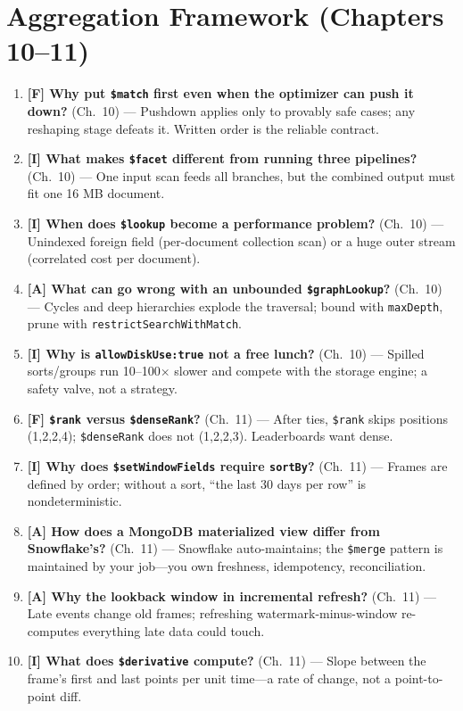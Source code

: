 \section{Aggregation Framework (Chapters 10--11)}
\begin{enumerate}
    \item \textbf{[F] Why put \texttt{\$match} first even when the optimizer can push it down?} (Ch.~10) --- Pushdown applies only to provably safe cases; any reshaping stage defeats it. Written order is the reliable contract.
    \item \textbf{[I] What makes \texttt{\$facet} different from running three pipelines?} (Ch.~10) --- One input scan feeds all branches, but the combined output must fit one 16 MB document.
    \item \textbf{[I] When does \texttt{\$lookup} become a performance problem?} (Ch.~10) --- Unindexed foreign field (per-document collection scan) or a huge outer stream (correlated cost per document).
    \item \textbf{[A] What can go wrong with an unbounded \texttt{\$graphLookup}?} (Ch.~10) --- Cycles and deep hierarchies explode the traversal; bound with \texttt{maxDepth}, prune with \texttt{restrictSearchWithMatch}.
    \item \textbf{[I] Why is \texttt{allowDiskUse:true} not a free lunch?} (Ch.~10) --- Spilled sorts/groups run 10--100$\times$ slower and compete with the storage engine; a safety valve, not a strategy.
    \item \textbf{[F] \texttt{\$rank} versus \texttt{\$denseRank}?} (Ch.~11) --- After ties, \texttt{\$rank} skips positions (1,2,2,4); \texttt{\$denseRank} does not (1,2,2,3). Leaderboards want dense.
    \item \textbf{[I] Why does \texttt{\$setWindowFields} require \texttt{sortBy}?} (Ch.~11) --- Frames are defined by order; without a sort, ``the last 30 days per row'' is nondeterministic.
    \item \textbf{[A] How does a MongoDB materialized view differ from Snowflake's?} (Ch.~11) --- Snowflake auto-maintains; the \texttt{\$merge} pattern is maintained by your job---you own freshness, idempotency, reconciliation.
    \item \textbf{[A] Why the lookback window in incremental refresh?} (Ch.~11) --- Late events change old frames; refreshing watermark-minus-window re-computes everything late data could touch.
    \item \textbf{[I] What does \texttt{\$derivative} compute?} (Ch.~11) --- Slope between the frame's first and last points per unit time---a rate of change, not a point-to-point diff.
\end{enumerate}

